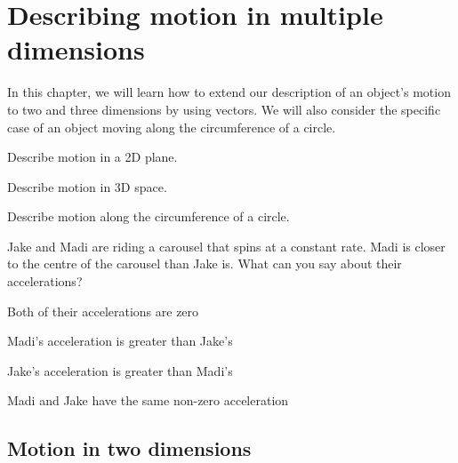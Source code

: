 
\chapter{Describing motion in multiple dimensions}
\label{chapter:describingmotioninnd}
In this chapter, we will learn how to extend our description of an object's motion to two and three dimensions by using vectors. We will also consider the specific case of an object moving along the circumference of a circle. 

\vspace{1cm}
\begin{learningObjectives}
\item Describe motion in a 2D plane.
\item Describe motion in 3D space.
\item Describe motion along the circumference of a circle.
\end{learningObjectives}

\begin{openingMC}{Jake and Madi are riding a carousel that spins at a constant rate. Madi is closer to the centre of the carousel than Jake is. What can you say about their accelerations?}
\item Both of their accelerations are zero
\item Madi's acceleration is greater than Jake's
\item Jake's acceleration is greater than Madi's
\item Madi and Jake have the same non-zero acceleration
\end{openingMC}

\section{Motion in two dimensions}

